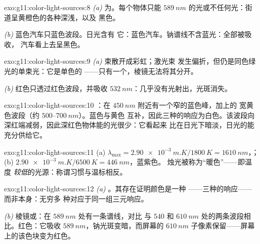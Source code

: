 \begin{solution}{exo:g11:color-light-sources:8}
\emph{(a)} 为。每个物体只能
$\qty{589}{nm}$ 的光或不任何光：街道呈黄橙色的各种深浅，以及
黑色。

\emph{(b)} 蓝色汽车只蓝色波段。日光含有
它：蓝色汽车。钠谱线不含蓝光：全部被吸收，
汽车看上去呈黑色。
\end{solution}

\begin{solution}{exo:g11:color-light-sources:9}
\emph{(a)} 束散开成彩虹；激光束
发生偏折，但仍是同色绿光的单束光：它是单色的
——只有一个，棱镜无法将其分开。

\emph{(b)} 红色只透过红色波段，并吸收
$\qty{532}{nm}$：几乎没有光射出，光斑消失。
\end{solution}

\begin{solution}{exo:g11:color-light-sources:10}
：在 $\qty{450}{nm}$ 附近有一个窄的蓝色峰，加上的
宽黄色波段（约 $500$--$\qty{700}{nm}$）。蓝色与黄色
互补，因此三种的响应为白色。该波段向
深红端减弱，因此深红色物体能的光很少：它看起来
比在日光下暗淡，日光的能充分供给它。
\end{solution}

\begin{solution}{exo:g11:color-light-sources:11}
(a) $\lambda_{\max} = \qty{2.90e-3}{m.K}/\qty{1800}{K}
= \qty{1610}{nm}$，；
(b) $\qty{2.90e-3}{m.K}/\qty{6500}{K} = \qty{446}{nm}$，蓝紫色。
烛光被称为“暖色”——即温度
\emph{较低}的光源：称谓习惯与温标相反。
\end{solution}

\begin{solution}{exo:g11:color-light-sources:12}
\emph{(a)} 。其存在证明颜色是一种
——三种的响应——而非本身：无穷多
种对应于同一组三元响应。

\emph{(b)} 棱镜或：在 $\qty{589}{nm}$ 处有一条谱线，对比
与 $540$ 和 $\qty{610}{nm}$ 处的两条波段相比。红色：它吸收
$\qty{589}{nm}$，钠光斑变暗，而屏幕的
$\qty{610}{nm}$ 子像素保留——屏幕上的该色块变为红色。
\end{solution}

